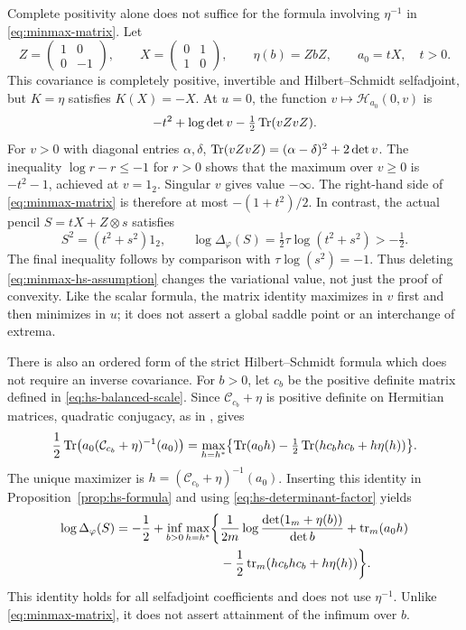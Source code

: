 Complete positivity alone does not suffice for the formula involving $\eta^{-1}$ in \eqref{eq:minmax-matrix}.
Let
\[
 Z=\begin{pmatrix}1&0\\0&-1\end{pmatrix},\qquad
 X=\begin{pmatrix}0&1\\1&0\end{pmatrix},\qquad
 \eta(b)=ZbZ,\qquad a_0=tX,\quad t>0.
\]
This covariance is completely positive, invertible and Hilbert--Schmidt selfadjoint, but $K=\eta$ satisfies $K(X)=-X$.
At $u=0$, the function $v\mapsto\mathcal H_{a_0}(0,v)$ is
\[
 -t^2+\log\det v-\tfrac12\operatorname{Tr}(vZvZ).
\]
For $v>0$ with diagonal entries $\alpha,\delta$, $\operatorname{Tr}(vZvZ)=(\alpha-\delta)^2+2\det v$.
The inequality $\log r-r\le-1$ for $r>0$ shows that the maximum over $v\ge0$ is $-t^2-1$, achieved at $v=1_2$.
Singular $v$ gives value $-\infty$.
The right-hand side of \eqref{eq:minmax-matrix} is therefore at most $-(1+t^2)/2$.
In contrast, the actual pencil $S=tX+Z\otimes s$ satisfies
\[
 S^2=(t^2+s^2)1_2,\qquad
 \log\Delta_\varphi(S)=\tfrac12\tau\log(t^2+s^2)>-\tfrac12.
\]
The final inequality follows by comparison with $\tau\log(s^2)=-1$.
Thus deleting \eqref{eq:minmax-hs-assumption} changes the variational value, not just the proof of convexity.
Like the scalar formula, the matrix identity maximizes in $v$ first and then minimizes in $u$; it does not assert a global saddle point or an interchange of extrema.

\begin{remark}\label{prop:minmax-square-completion}
There is also an ordered form of the strict Hilbert--Schmidt formula which does not require an inverse covariance.
For $b>0$, let $c_b$ be the positive definite matrix defined in \eqref{eq:hs-balanced-scale}.
Since $\mathcal C_{c_b}+\eta$ is positive definite on Hermitian matrices, quadratic conjugacy, as in \cite[Example 3.22]{BV04}, gives
\begin{align*}
 \frac12\operatorname{Tr}\bigl(a_0(\mathcal C_{c_b}+\eta)^{-1}(a_0)\bigr)
 =\max_{h=h^*}\bigl\{\operatorname{Tr}(a_0h)
       -\tfrac12\operatorname{Tr}(hc_bhc_b+h\eta(h))\bigr\}.
\end{align*}
The unique maximizer is $h=(\mathcal C_{c_b}+\eta)^{-1}(a_0)$.
Inserting this identity in Proposition~\ref{prop:hs-formula} and using \eqref{eq:hs-determinant-factor} yields
\begin{equation}\label{eq:minmax-hs-square-completion}
\begin{split}
 \log\Delta_\varphi(S)=-\frac12+\inf_{b>0}\max_{h=h^*}
 \biggl\{&\frac1{2m}\log\frac{\det(1_m+\eta(b))}{\det b}
       +\operatorname{tr}_m(a_0h)\\
       &-\frac12\operatorname{tr}_m(hc_bhc_b+h\eta(h))\biggr\}.
\end{split}
\end{equation}
This identity holds for all selfadjoint coefficients and does not use $\eta^{-1}$.
Unlike \eqref{eq:minmax-matrix}, it does not assert attainment of the infimum over $b$.
\end{remark}
